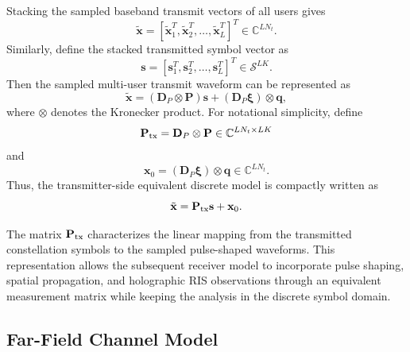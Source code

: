 \documentclass[journal]{IEEEtran}
\begin{document}
Stacking the sampled baseband transmit vectors of all users gives
\begin{equation}
\tilde{\mathbf{x}}
=
[\tilde{\mathbf{x}}_1^T,\tilde{\mathbf{x}}_2^T,\ldots,\tilde{\mathbf{x}}_L^T]^T
\in\mathbb{C}^{LN_t}.
\end{equation}
Similarly, define the stacked transmitted symbol vector as
\begin{equation}
\mathbf{s}
=
[\mathbf{s}_1^T,\mathbf{s}_2^T,\ldots,\mathbf{s}_L^T]^T
\in\mathcal{S}^{LK}.
\end{equation}
Then the sampled multi-user transmit waveform can be represented as
\begin{equation}
\tilde{\mathbf{x}}
=
(\mathbf{D}_P\otimes\mathbf{P})\mathbf{s}
+
(\mathbf{D}_P\boldsymbol{\xi})\otimes\mathbf{q},
\label{eq:stacked_transmit_waveform}
\end{equation}
where $\otimes$ denotes the Kronecker product. 
For notational simplicity, define
\begin{equation}
\mathbf{P}_{\rm tx}
=
\mathbf{D}_P\otimes\mathbf{P}
\in\mathbb{C}^{LN_t\times LK}
\end{equation}
and
\begin{equation}
\mathbf{x}_0
=
(\mathbf{D}_P\boldsymbol{\xi})\otimes\mathbf{q}
\in\mathbb{C}^{LN_t}.
\end{equation}
Thus, the transmitter-side equivalent discrete model is compactly written as
\begin{equation}
\tilde{\mathbf{x}}
=
\mathbf{P}_{\rm tx}\mathbf{s}
+
\mathbf{x}_0.
\label{eq:compact_transmitter_model}
\end{equation}

The matrix $\mathbf{P}_{\rm tx}$ characterizes the linear mapping from the transmitted constellation symbols to the sampled pulse-shaped waveforms. 
This representation allows the subsequent receiver model to incorporate pulse shaping, spatial propagation, and holographic RIS observations through an equivalent measurement matrix while keeping the analysis in the discrete symbol domain.

\subsection{Far-Field Channel Model}
\end{document}
